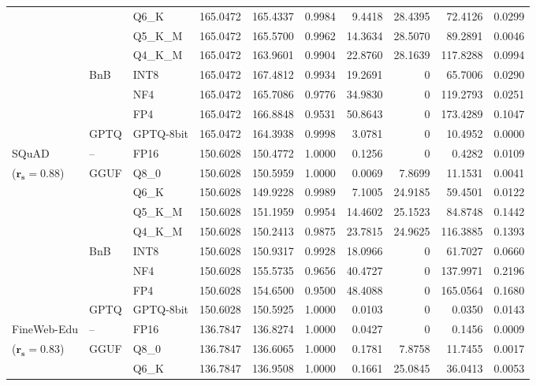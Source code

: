 \begin{longtable}{ll l rrrrrrr}
 &  & Q6\_K & 165.0472 & 165.4337 & 0.9984 & 9.4418 & 28.4395 & 72.4126 & 0.0299 \\
 &  & Q5\_K\_M & 165.0472 & 165.5700 & 0.9962 & 14.3634 & 28.5070 & 89.2891 & 0.0046 \\
 &  & Q4\_K\_M & 165.0472 & 163.9601 & 0.9904 & 22.8760 & 28.1639 & 117.8288 & 0.0994 \\
 & BnB & INT8 & 165.0472 & 167.4812 & 0.9934 & 19.2691 & \cellcolor{cyan!12} $0$ & 65.7006 & 0.0290 \\
 &  & NF4 & 165.0472 & 165.7086 & 0.9776 & 34.9830 & \cellcolor{cyan!12} $0$ & 119.2793 & 0.0251 \\
 &  & FP4 & 165.0472 & 166.8848 & 0.9531 & 50.8643 & \cellcolor{cyan!12} $0$ & 173.4289 & 0.1047 \\
 & GPTQ & GPTQ-8bit & 165.0472 & 164.3938 & 0.9998 & 3.0781 & \cellcolor{cyan!12} $0$ & 10.4952 & 0.0000 \\
\midrule
SQuAD & -- & FP16 & 150.6028 & 150.4772 & 1.0000 & 0.1256 & \cellcolor{cyan!12} $0$ & 0.4282 & 0.0109 \\
{\small ($\mathbf{r_s{=}0.88}$)} & GGUF & Q8\_0 & 150.6028 & 150.5959 & 1.0000 & 0.0069 & 7.8699 & 11.1531 & 0.0041 \\
 &  & Q6\_K & 150.6028 & 149.9228 & 0.9989 & 7.1005 & 24.9185 & 59.4501 & 0.0122 \\
 &  & Q5\_K\_M & 150.6028 & 151.1959 & 0.9954 & 14.4602 & 25.1523 & 84.8748 & 0.1442 \\
 &  & Q4\_K\_M & 150.6028 & 150.2413 & 0.9875 & 23.7815 & 24.9625 & 116.3885 & 0.1393 \\
 & BnB & INT8 & 150.6028 & 150.9317 & 0.9928 & 18.0966 & \cellcolor{cyan!12} $0$ & 61.7027 & 0.0660 \\
 &  & NF4 & 150.6028 & 155.5735 & 0.9656 & 40.4727 & \cellcolor{cyan!12} $0$ & 137.9971 & 0.2196 \\
 &  & FP4 & 150.6028 & 154.6500 & 0.9500 & 48.4088 & \cellcolor{cyan!12} $0$ & 165.0564 & 0.1680 \\
 & GPTQ & GPTQ-8bit & 150.6028 & 150.5925 & 1.0000 & 0.0103 & \cellcolor{cyan!12} $0$ & 0.0350 & 0.0143 \\
\midrule
FineWeb-Edu & -- & FP16 & 136.7847 & 136.8274 & 1.0000 & 0.0427 & \cellcolor{cyan!12} $0$ & 0.1456 & 0.0009 \\
{\small ($\mathbf{r_s{=}0.83}$)} & GGUF & Q8\_0 & 136.7847 & 136.6065 & 1.0000 & 0.1781 & 7.8758 & 11.7455 & 0.0017 \\
 &  & Q6\_K & 136.7847 & 136.9508 & 1.0000 & 0.1661 & 25.0845 & 36.0413 & 0.0053 \\

\end{longtable}
